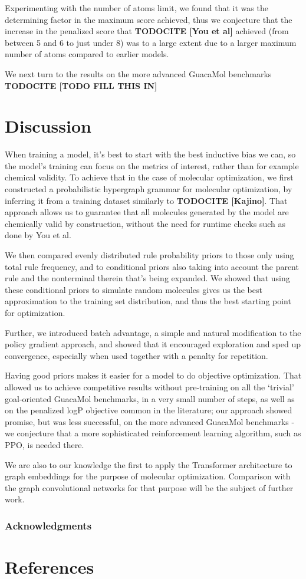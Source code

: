 \documentclass{article}
\newcommand{\CITE}[1]{{\bf TODOCITE [#1]}}
\begin{document}
Experimenting with the number of atoms limit, we found that it was the determining factor in the maximum score achieved, thus we conjecture that the increase in the penalized score that \CITE{You et al} achieved (from between 5 and 6 to just under 8) was to a large extent due to a larger maximum number of atoms compared to earlier models.

We next turn to the results on the more advanced GuacaMol benchmarks \CITE{TODO FILL THIS IN}

\section{Discussion}
When training a model, it's best to start with the best inductive bias we can, so the model's training can focus on the metrics of interest, rather than for example chemical validity. To achieve that in the case of molecular optimization, we first constructed a probabilistic hypergraph grammar for molecular optimization, by inferring it from a training dataset similarly to \CITE{Kajino}. That approach allows us to guarantee that all molecules generated by the model are chemically valid by construction, without the need for runtime checks such as done by You et al. 

We then compared evenly distributed rule probability priors to those only using total rule frequency, and to conditional priors also taking into account the parent rule and the nonterminal therein that's being expanded. We showed that using these conditional priors to simulate random molecules gives us the best approximation to the training set distribution, and thus the best starting point for optimization.

Further, we introduced batch advantage, a simple and natural modification to the policy gradient approach, and showed that it encouraged exploration and sped up convergence, especially when used together with a penalty for repetition.

Having good priors makes it easier for a model to do objective optimization. That allowed us to achieve competitive results without pre-training on all the `trivial' goal-oriented GuacaMol benchmarks, in a very small number of steps, as well as on the penalized logP objective common in the literature;  our approach showed promise, but was less successful, on the more advanced GuacaMol benchmarks - we conjecture that a more sophisticated reinforcement learning algorithm, such as PPO, is needed there.

We are also to our knowledge the first to apply the Transformer architecture to graph embeddings for the purpose of molecular optimization. Comparison with the graph convolutional networks for that purpose will be the subject of further work.



\subsubsection*{Acknowledgments}

\section*{References}
\medskip

\small
 

\end{document}
